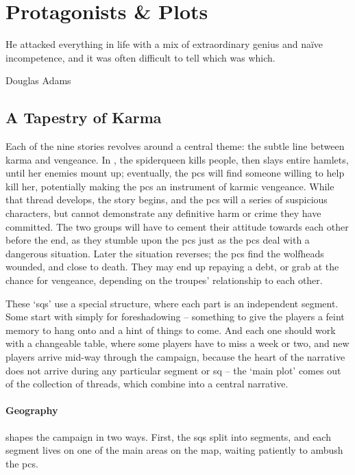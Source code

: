 \chapter{Protagonists \& Plots}
  \epigraph{He attacked everything in life with a mix of extraordinary genius and na\"ive incompetence, and it was often difficult to tell which was which.}{Douglas Adams}
\label{sideQuestIntro}

\section{A Tapestry of Karma}
\label{sqSummaries}

\begin{multicols}{2}


\noindent
Each of the nine stories revolves around a central theme: the subtle line between karma and vengeance.
In , the \gls{spiderqueen} kills people, then slays entire hamlets, until her enemies mount up; eventually, the \glspl{pc} will find someone willing to help kill her, potentially making the \glspl{pc} an instrument of karmic vengeance.
While that thread develops, the  story begins, and the \glspl{pc} will a series of suspicious characters, but cannot demonstrate any definitive harm or crime they have committed.
The two groups will have to cement their attitude towards each other before the end, as they stumble upon the \glspl{pc} just as the \glspl{pc} deal with a dangerous situation.
Later the situation reverses; the \glspl{pc} find the \glspl{wolfhead} wounded, and close to death.
They may end up repaying a debt, or grab at the chance for vengeance, depending on the troupes' relationship to each other.


These `\glspl{sq}' use a special structure, where each part is an independent \gls{segment}.
Some start with  simply for foreshadowing -- something to give the players a feint memory to hang onto and a hint of things to come.
And each one should work with a changeable table, where some players have to miss a week or two, and new players arrive mid-way through the \gls{campaign}, because the heart of the narrative does not arrive during any particular \gls{segment} or \gls{sq} -- the `main plot' comes out of the collection of threads, which combine into a central narrative.


\subsubsection{Geography}
shapes the \gls{campaign} in two ways.
First, the \glspl{sq} split into \glspl{segment}, and each \gls{segment} lives on one of the main areas on the map, waiting patiently to ambush the \glspl{pc}.


\end{multicols}
